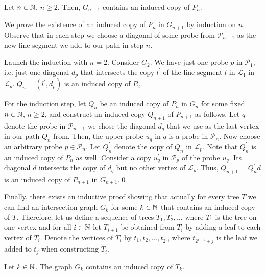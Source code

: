 \begin{thm}
Let $n\in\mathbb{N}$, $n\geq 2$. Then, $G_{n+1}$ contains an induced copy of $P_n$.
\end{thm}
\begin{prf}
We prove the existence of an induced copy of $P_n$ in $G_{n+1}$ by induction on $n$. Observe that in each step we choose a diagonal of some probe from $\mathcal{P}_{n-1}$ as the new line segment we add to our path in step $n$.

Launch the induction with $n=2$. Consider $G_2$. We have just one probe $p$ in $\mathcal{P}_1$, i.e. just one diagonal $d_p$ that intersects the copy $l^\prime$ of the line segment $l$ in $\mathcal{L}_1$ in $\mathcal{L}_p$. $Q_n = (l^\prime ,d_p)$ is an induced copy of $P_2$.

For the induction step, let $Q_n$ be an induced copy of $P_n$ in $G_n$ for some fixed $n\in\mathbb{N}$, $n\geq 2$, and construct an induced copy $Q_{n+1}$ of $P_{n+1}$ as follows. Let $q$ denote the probe in $\mathcal{P}_{n-1}$ we chose the diagonal $d_q$ that we use as the last vertex in our path $Q_n$ from. Then, the upper probe $u_q$ in $q$ is a probe in $\mathcal{P}_n$. Now choose an arbitrary probe $p\in\mathcal{P}_n$. Let $Q_n^\prime$ denote the copy of $Q_n$ in $\mathcal{L}_p$. Note that $Q_n^\prime$ is an induced copy of $P_n$ as well. Consider a copy $u_q^\prime$ in $\mathcal{P}_p$ of the probe $u_q$. Its diagonal $d$ intersects the copy of $d_q$ but no other vertex of $\mathcal{L}_p$. Thus, $Q_{n+1}=Q_{n}^\prime d$ is an induced copy of $P_{n+1}$ in $G_{n+1}$.\qed
\end{prf}

Finally, there exists an inductive proof showing that actually for every tree $T$ we can find an intersection graph $G_k$ for some $k\in\mathbb{N}$ that contains an induced copy of $T$. Therefore, let us define a sequence of trees $T_1, T_2, \dots$ where $T_1$ is the tree on one vertex and for all $i\in\mathbb{N}$ let $T_{i+1}$ be obtained from $T_i$ by adding a leaf to each vertex of $T_i$. Denote the vertices of $T_i$ by $t_1, t_2,\dots ,t_{2^i}$, where $t_{2^{i-1}+j}$ is the leaf we added to $t_j$ when constructing $T_i$.

\begin{thm}\label{t1ls}
Let $k\in\mathbb{N}$. The graph $G_k$ contains an induced copy of $T_k$.
\end{thm}

